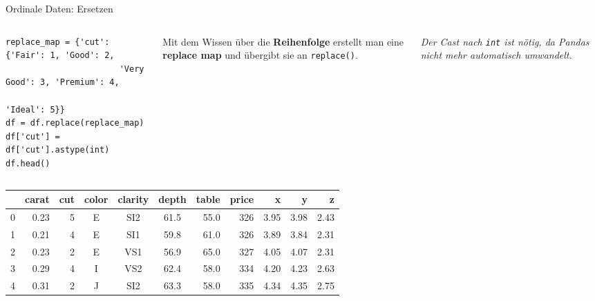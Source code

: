 \begin{frame}[fragile]{Ordinale Daten: Ersetzen}
\footnotesize
\begin{columns}
\begin{verbatim}
replace_map = {'cut': {'Fair': 1, 'Good': 2,
                       'Very Good': 3, 'Premium': 4,
                       'Ideal': 5}}
df = df.replace(replace_map)
df['cut'] = df['cut'].astype(int)
df.head()
\end{verbatim}

Mit dem Wissen über die \textbf{Reihenfolge} erstellt man eine
\textbf{replace map} und übergibt sie an \texttt{replace()}.

\vspace{0.4em}
{\footnotesize\itshape Der Cast nach \texttt{int} ist nötig, da Pandas
nicht mehr automatisch umwandelt.}
\end{columns}

\vspace{0.6em}
\centering

\renewcommand{\arraystretch}{1.3}
\begin{tabular}{r r r c c c r r r r r}
& \textbf{carat} & \textbf{cut} & \textbf{color} & \textbf{clarity}
& \textbf{depth} & \textbf{table} & \textbf{price} & \textbf{x} & \textbf{y} & \textbf{z}\\
\hline
0 & 0.23 & 5 & E & SI2 & 61.5 & 55.0 & 326 & 3.95 & 3.98 & 2.43\\
1 & 0.21 & 4 & E & SI1 & 59.8 & 61.0 & 326 & 3.89 & 3.84 & 2.31\\
2 & 0.23 & 2 & E & VS1 & 56.9 & 65.0 & 327 & 4.05 & 4.07 & 2.31\\
3 & 0.29 & 4 & I & VS2 & 62.4 & 58.0 & 334 & 4.20 & 4.23 & 2.63\\
4 & 0.31 & 2 & J & SI2 & 63.3 & 58.0 & 335 & 4.34 & 4.35 & 2.75\\
\end{tabular}

\end{frame}


